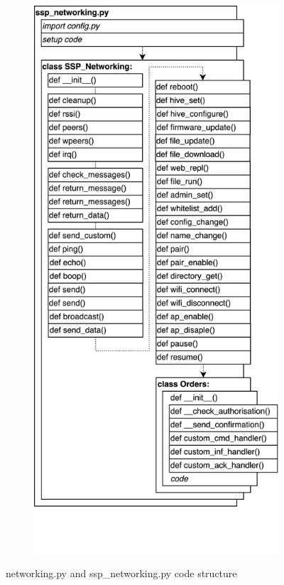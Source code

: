 \begin{figure}[H]
\begin{subfigure}[b]{0.45\textwidth}
    \end{subfigure}%
    \hspace{0.05\textwidth}
    \begin{subfigure}[b]{0.45\textwidth}%
        \includegraphics[width=\textwidth]{overleaf/images/ssp_networking_structure.drawio.png}%
    \end{subfigure}%
    \vspace{\ftspace}
    \caption{networking.py and ssp\_networking.py code structure}
    \label{fig:net_net_structure}
\end{figure}

